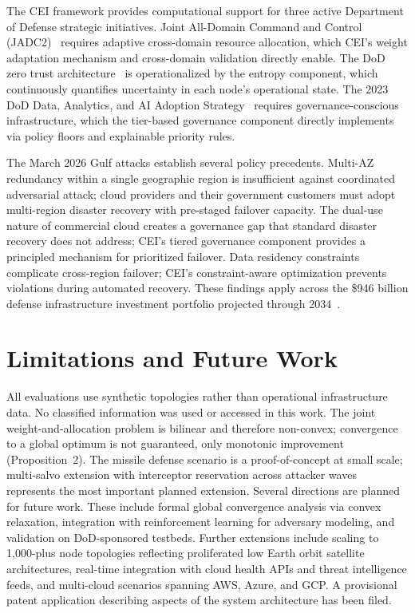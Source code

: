 \documentclass[runningheads]{llncs}
\begin{document}
The CEI framework provides computational support for three active Department of Defense strategic initiatives. Joint All-Domain Command and Control (JADC2)~\cite{jadc2} requires adaptive cross-domain resource allocation, which CEI's weight adaptation mechanism and cross-domain validation directly enable. The DoD zero trust architecture~\cite{gao_it} is operationalized by the entropy component, which continuously quantifies uncertainty in each node's operational state. The 2023 DoD Data, Analytics, and AI Adoption Strategy~\cite{dod_ai} requires governance-conscious infrastructure, which the tier-based governance component directly implements via policy floors and explainable priority rules.

The March 2026 Gulf attacks establish several policy precedents. Multi-AZ redundancy within a single geographic region is insufficient against coordinated adversarial attack; cloud providers and their government customers must adopt multi-region disaster recovery with pre-staged failover capacity. The dual-use nature of commercial cloud creates a governance gap that standard disaster recovery does not address; CEI's tiered governance component provides a principled mechanism for prioritized failover. Data residency constraints complicate cross-region failover; CEI's constraint-aware optimization prevents violations during automated recovery. These findings apply across the \$946 billion defense infrastructure investment portfolio projected through 2034~\cite{cbo}.

\section{Limitations and Future Work}
\label{sec:limitations}

All evaluations use synthetic topologies rather than operational infrastructure data. No classified information was used or accessed in this work. The joint weight-and-allocation problem is bilinear and therefore non-convex; convergence to a global optimum is not guaranteed, only monotonic improvement (Proposition~2). The missile defense scenario is a proof-of-concept at small scale; multi-salvo extension with interceptor reservation across attacker waves represents the most important planned extension. Several directions are planned for future work. These include formal global convergence analysis via convex relaxation, integration with reinforcement learning for adversary modeling, and validation on DoD-sponsored testbeds. Further extensions include scaling to 1{,}000-plus node topologies reflecting proliferated low Earth orbit satellite architectures, real-time integration with cloud health APIs and threat intelligence feeds, and multi-cloud scenarios spanning AWS, Azure, and GCP. A provisional patent application describing aspects of the system architecture has been filed.
\end{document}
